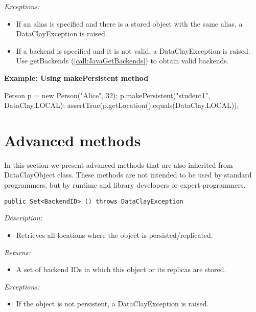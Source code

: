 \begin{dBox}
{\it Exceptions:}

\begin{itemize}
    \item If an alias is specified and there is a stored object with the same alias, a DataClayException is raised.
    \item If a backend is specified and it is not valid, a DataClayException is raised. Use getBackends (\ref{call:JavaGetBackends}) to obtain valid backends.
\end{itemize}

\end{dBox}

\begin{tBox}
\textcolor{basecolor} {\bf Example: Using makePersistent method}
\begin{java}
Person p = new Person("Alice", 32);
p.makePersistent("student1", DataClay.LOCAL);
assertTrue(p.getLocation().equals(DataClay.LOCAL));
\end{java}
\end{tBox}



\section{Advanced methods}
\label{sec:JavaObjectAdvanced}

In this section we present advanced methods that are also inherited from DataClayObject class. These methods are not intended to be used by standard programmers, but by runtime and library developers or expert programmers.



\begin{dBox}
\texttt{public Set<BackendID> () throws DataClayException}
\LINE

{\it Description:}

\begin{itemize}
    \item Retrieves all locations where the object is persisted/replicated.
\end{itemize}

{\it Returns:}

\begin{itemize}
    \item A set of backend IDs in which this object or its replicas are stored.
\end{itemize}

{\it Exceptions:}

\begin{itemize}
    \item If the object is not persistent, a DataClayException is raised.
\end{itemize}

\end{dBox}

